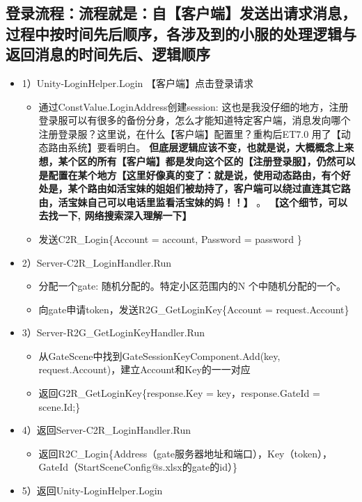 \documentclass[9pt, b5paper]{article}
\begin{document}
\subsection{登录流程：流程就是：自【客户端】发送出请求消息，过程中按时间先后顺序，各涉及到的小服的处理逻辑与返回消息的时间先后、逻辑顺序}
\label{sec-4-2}
\begin{itemize}
\item 1）Unity-LoginHelper.Login 【客户端】点击登录请求
\begin{itemize}
\item 通过ConstValue.LoginAddress创建session: 这也是我没仔细的地方，注册登录服可以有很多的备份分身，怎么才能知道特定客户端，消息发向哪个注册登录服？这里说，在什么【客户端】配置里？重构后ET7.0 用了【动态路由系统】要看明白。 \textbf{但底层逻辑应该不变，也就是说，大概概念上来想，某个区的所有【客户端】都是发向这个区的【注册登录服】，仍然可以是配置在某个地方【这里好像真的变了：就是说，使用动态路由，有个好处是，某个路由如活宝妹的姐姐们被劫持了，客户端可以绕过直连其它路由，活宝妹自己可以电话里监看活宝妹的妈！！】} 。 \textbf{【这个细节，可以去找一下, 网络搜索深入理解一下】}
\item 发送C2R\_Login\{Account = account, Password = password \}
\end{itemize}
\item 2）Server-C2R\_LoginHandler.Run
\begin{itemize}
\item 分配一个gate: 随机分配的。特定小区范围内的N 个中随机分配的一个。
\item 向gate申请token，发送R2G\_GetLoginKey\{Account = request.Account\}
\end{itemize}
\item 3）Server-R2G\_GetLoginKeyHandler.Run
\begin{itemize}
\item 从GateScene中找到GateSessionKeyComponent.Add(key, request.Account)，建立Account和Key的一一对应
\item 返回G2R\_GetLoginKey\{response.Key = key，response.GateId = scene.Id;\}
\end{itemize}
\item 4）返回Server-C2R\_LoginHandler.Run
\begin{itemize}
\item 返回R2C\_Login\{Address（gate服务器地址和端口），Key（token），GateId（StartSceneConfig@s.xlsx的gate的id）\}
\end{itemize}
\item 5）返回Unity-LoginHelper.Login
\begin{itemize}

\end{itemize}
\end{itemize}
\end{document}
